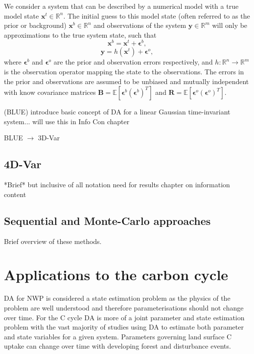 \documentclass[12pt]{article}
\begin{document}
We consider a system that can be described by a numerical model with a true model state \(\textbf{x}^{t} \in \mathbb{R}^{n}\). The initial guess to this model state (often referred to as the prior or background) \(\textbf{x}^{b} \in \mathbb{R}^{n}\) and observations of the system \(\textbf{y} \in \mathbb{R}^{m}\) will only be approximations to the true system state, such that
\begin{equation}
\textbf{x}^{b} = \textbf{x}^{t} + \bm{\epsilon}^{b},
\end{equation} 
\begin{equation}
\textbf{y} = h(\textbf{x}^{t}) + \bm{\epsilon}^{o},
\end{equation} 
where \( \bm{\epsilon}^{b}\) and \( \bm{\epsilon}^{o}\) are the prior and observation errors respectively, and \(h: \mathbb{R}^n\rightarrow \mathbb{R}^{m}\) is the observation operator mapping the state to the observations. The errors in the prior and observations are assumed to be unbiased and mutually independent with know covariance matrices \(\textbf{B} = \mathbb{E}[\bm{\epsilon}^{b}(\bm{\epsilon}^{b})^{T}]\) and \(\textbf{R} = \mathbb{E}[\bm{\epsilon}^{o}(\bm{\epsilon}^{o})^{T}]\).  

(BLUE) introduce basic concept of DA for a linear Gaussian time-invariant system... will use this in Info Con chapter

BLUE \(\rightarrow\) 3D-Var

\subsection{4D-Var}

*Brief* but inclusive of all notation need for results chapter on information content

\subsection{Sequential and Monte-Carlo approaches}

Brief overview of these methods.

\section{Applications to the carbon cycle}

DA for NWP is considered a state estimation problem as the physics of the problem are well understood and therefore parameterisations should not change over time. For the C cycle DA is more of a joint parameter and state estimation problem with the vast majority of studies using DA to estimate both parameter and state variables for a given system. Parameters governing land surface C uptake can change over time with developing forest and disturbance events.  
\end{document}
